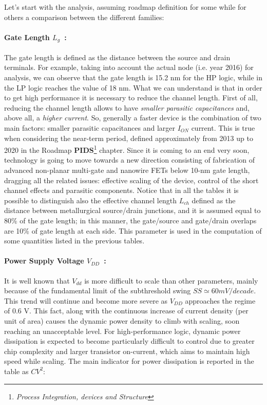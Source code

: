 \documentclass[a4paper, 12pt, twoside, openright]{report}
\begin{document}
\noindent Let's start with the analysis, assuming roadmap definition for some while for others a comparison between the different families:

\paragraph{Gate Length $L_{g}$~:}The gate length is defined as the distance between the source and drain terminals. For example, taking into account the actual node (i.e. year 2016) for analysis, we can observe that the gate length is 15.2 nm for the HP logic, while in the LP logic reaches the value of 18 nm. What we can understand is that in order to get high performance it is necessary to reduce the channel length. First of all, reducing the channel length allows to have \emph{smaller parasitic capacitances} and, above all, a \emph{higher current}. So, generally a faster device is the combination of two main factors: smaller parasitic capacitances and larger $I_{ON}$ current.
This is true when considering the near-term period, defined approximately from 2013 up to 2020 in the Roadmap \textbf{PIDS}\footnote{\emph{Process Integration, devices and Structure}} chapter. Since it is coming to an end very soon, technology is going to move towards a new direction consisting of fabrication of advanced non-planar multi-gate and nanowire FETs below 10-nm gate length, dragging all the related issues: effective scaling of the device, control of the short channel effects and parasitic components.
Notice that in all the tables it is possible to distinguish also the effective channel length $L_{ch}$ defined as the distance between metallurgical source/drain junctions, and it is assumed equal to 80\% of the gate length; in this manner, the gate/source and gate/drain overlaps are 10\% of gate length at each side. This parameter is used in the computation of some quantities listed in the previous tables.

\paragraph{Power Supply Voltage $V_{DD}$~:} It is well known that $V_{dd}$ is more difficult to scale than other parameters, mainly because of the fundamental limit of the subthreshold swing $SS\simeq60 mV/decade$. This trend will continue and become more severe as $V_{DD}$ approaches the regime of 0.6 V. This fact, along with the continuous increase of current density (per unit of area) causes the dynamic power density to climb with scaling, soon reaching an unacceptable level.
For high-performance logic, dynamic power dissipation is expected to become particularly difficult to control due to greater chip complexity and larger transistor on-current, which aims to maintain high speed while scaling. The main indicator for power dissipation is reported in the table as $CV^{2}$:
\end{document}
